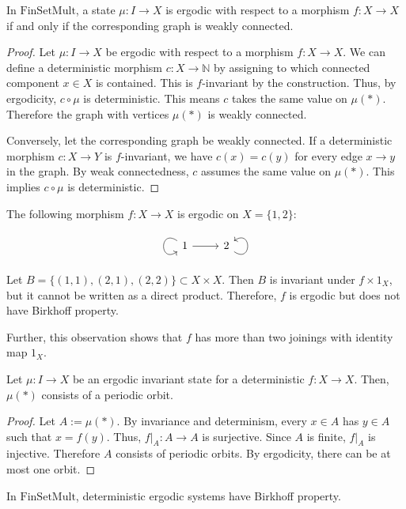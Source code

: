 \documentclass[12pt,oneside,pb-diagram]{article}
\begin{document}
\begin{theorem}
	In $\mathrm{FinSetMult}$, a state $\mu: I \to X$ is ergodic with respect to a morphism $f:X \to X$ if and only if the corresponding graph is weakly connected.
\end{theorem}
\begin{proof}
	Let $\mu: I \to X$ be ergodic with respect to a morphism $f:X \to X$. We can define a deterministic morphism $c: X \to \mathbb{N}$ by assigning to which connected component $x \in X$ is contained. This is $f$-invariant by the construction. Thus, by ergodicity, $c\circ \mu$ is deterministic. This means $c$ takes the same value on $\mu(*)$. Therefore the graph with vertices $\mu(*)$ is weakly connected.
	
	Conversely, let the corresponding graph be weakly connected. If a deterministic morphism $c: X \to Y$ is $f$-invariant, we have $c(x) = c(y)$ for every edge $x \to y$ in the graph. By weak connectedness, $c$ assumes the same value on $\mu(*)$. This implies $c \circ \mu$ is deterministic.
\end{proof}

\begin{example}
	The following morphism $f:X \to X$ is ergodic on $X = \{1,2\}$:
	\[
	\begin{tikzcd}
		1 \arrow[loop, distance=2em, in=215, out=145] \arrow[r] & 2 \arrow[loop, distance=2em, in=35, out=325]
	\end{tikzcd}
	\]
	Let $B= \{(1,1),(2,1), (2,2)\} \subset X \times X$. Then 
	$B$ is invariant under $f \times 1_X$, but it cannot be written as a direct product. Therefore, $f$ is ergodic but does not have Birkhoff property.
	
	Further, this observation shows that $f$ has more than two joinings with identity map $1_X$. 
\end{example}
\begin{lemma}
	Let $\mu: I \to X$ be an ergodic invariant state for a deterministic $f: X \to X$. Then, $\mu(*)$ consists of a  periodic orbit. 
\end{lemma}
\begin{proof}
	Let $A := \mu(*)$. By invariance and determinism, every $x \in A $ has $y \in A$ such that $x = f(y)$. Thus, $f|_A: A \to A$ is surjective. Since $A$ is finite, $f|_A$ is injective. Therefore $A$ consists of periodic orbits. By ergodicity, there can be at most one orbit.
\end{proof}


\begin{theorem}
	In $\mathrm{FinSetMult}$, deterministic ergodic systems have Birkhoff property.
\end{theorem}
\end{document}
